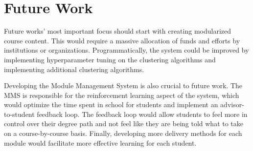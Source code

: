 \chapter{Future Work}
\label{ch:futurework}

Future works' most important focus should start with creating modularized course content. This would require a massive allocation of funds and efforts by institutions or organizations. Programmatically, the system could be improved by implementing hyperparameter tuning on the clustering algorithms and implementing additional clustering algorithms.

Developing the Module Management System is also crucial to future work. The MMS is responsible for the reinforcement learning aspect of the system, which would optimize the time spent in school for students and implement an advisor-to-student feedback loop. The feedback loop would allow students to feel more in control over their degree path and not feel like they are being told what to take on a course-by-course basis. Finally, developing more delivery methods for each module would facilitate more effective learning for each student.